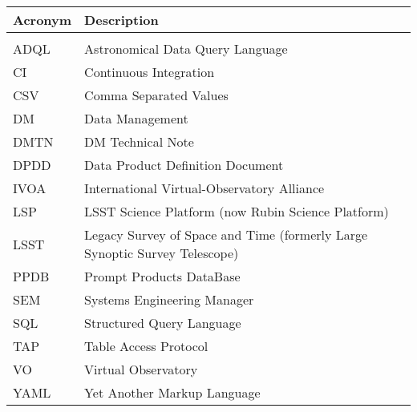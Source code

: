 \addtocounter{table}{-1}
\begin{longtable}{p{}p{}}\hline
\textbf{Acronym} & \textbf{Description}  \\\hline

 &  \\\hline
ADQL & Astronomical Data Query Language \\\hline
CI & Continuous Integration \\\hline
CSV & Comma Separated Values \\\hline
DM & Data Management \\\hline
DMTN & DM Technical Note \\\hline
DPDD & Data Product Definition Document \\\hline
IVOA & International Virtual-Observatory Alliance \\\hline
LSP & LSST Science Platform (now Rubin Science Platform) \\\hline
LSST & Legacy Survey of Space and Time (formerly Large Synoptic Survey Telescope) \\\hline
PPDB & Prompt Products DataBase \\\hline
SEM & Systems Engineering Manager \\\hline
SQL & Structured Query Language \\\hline
TAP & Table Access Protocol \\\hline
VO & Virtual Observatory \\\hline
YAML & Yet Another Markup Language \\\hline
\end{longtable}
